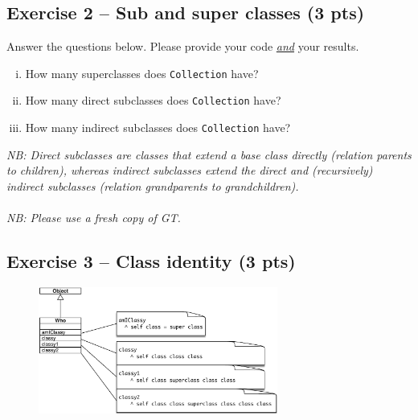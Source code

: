 \documentclass [11pt, a4wide, twoside]{article}
\begin{document}
\subsection*{Exercise 2 -- Sub and super classes (3 pts)}
Answer the questions below.
Please provide your code \emph{\underline{and}} your results.
\begin{enumerate}[i)]

\item How many superclasses does \texttt{Collection} have?

\item How many direct subclasses does \texttt{Collection} have?

\item How many indirect subclasses does \texttt{Collection} have?
\end{enumerate}
\emph{NB: Direct subclasses are classes that extend a base class directly (\eg relation parents to children), whereas indirect subclasses extend the direct and (recursively) indirect subclasses (\eg relation grandparents to grandchildren).}\\\\
\emph{NB: Please use a fresh copy of GT.}

\vspace{1.5cm}

\subsection*{Exercise 3 -- Class identity (3 pts)}
\begin{figure}[h]
\centering
\includegraphics[width=0.7\textwidth]{super.pdf}
\end{figure}
\noindent
\end{document}
